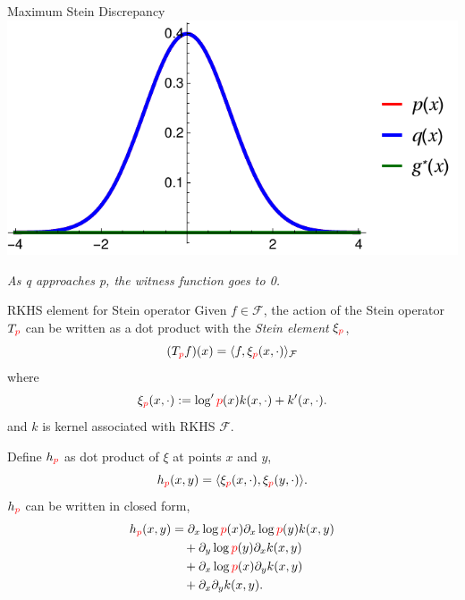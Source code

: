 \begin{frame}
\begin{columns}
\begin{column}{.33\linewidth}
\begin{block}{Maximum Stein Discrepancy}
\includegraphics[scale=1.2]{../../presentation/img/s0.pdf}
\vspace{1cm}
\begin{center}
\emph{As { \color{blue} q} approaches {\color{red} p}, the {\color{mg} witness function} goes to 0. }
\end{center}
\end{block} %


\vspace{-0.75cm}
\begin{block}{RKHS element for Stein operator}
\large
Given $f\in \mathcal{F}$, the action of the Stein operator $T_{\color{red} p}$ can be written as a dot product with the {\em Stein element} $\xi_{{ \color{red} p}}$,
 \begin{equation*}
(T_{\color{red} p} f)(x) = \langle f, \xi_{{ \color{red} p}}(x,\cdot) \rangle_{\mathcal{F}}
\end{equation*}
where
 \begin{equation*}
\xi_{{ \color{red} p}}(x,\cdot):=\log' { \color{red} p}(x) k(x,\cdot)+  k'(x,\cdot).
\end{equation*}
and $k$ is kernel associated with RKHS $\mathcal{F}$.

\vspace{2cm}
Define $h_{{ \color{red} p}}$ as dot product of  $\xi$ at points $x$ and $y$, 
\[
h_{{\color{red} p}}(x,y)   = \langle\xi_{{ \color{red} p}}(x,\cdot),\xi_{{ \color{red} p}}(y,\cdot)\rangle. 
\]
$h_{{ \color{red} p}}$ can be written in closed form,
\begin{align*}
h_{{\color{red} p}}(x,y) & = \partial_{x} \log {\color{red} p}(x) \partial_{x} \log {\color{red} p}(y) k(x,y)\\
 & \quad+\partial_{y} \log {\color{red} p}(y) \partial_{x}  k(x,y)\\
 & \quad+\partial_{x} \log {\color{red} p}(x) \partial_{y}k(x,y)\\
 & \quad+\partial_{x} \partial_{y} k(x,y).
\end{align*}


\end{block}
\end{column}
\end{columns}
\end{frame}

